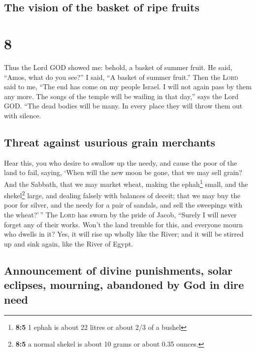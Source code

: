 \hypertarget{the-vision-of-the-basket-of-ripe-fruits}{%
\subsection{The vision of the basket of ripe
fruits}\label{the-vision-of-the-basket-of-ripe-fruits}}

\hypertarget{section-7}{%
\section{8}\label{section-7}}

 Thus the Lord GOD showed me: behold, a basket of summer
fruit.  He said, ``Amos, what do you see?'' I said, ``A
basket of summer fruit.'' Then the \textsc{Lord} said to me, ``The end
has come on my people Israel. I will not again pass by them any more.
 The songs of the temple will be wailing in that day,''
says the Lord GOD. ``The dead bodies will be many. In every place they
will throw them out with silence.

\hypertarget{threat-against-usurious-grain-merchants}{%
\subsection{Threat against usurious grain
merchants}\label{threat-against-usurious-grain-merchants}}

 Hear this, you who desire to swallow up the needy, and
cause the poor of the land to fail,  saying, `When will
the new moon be gone, that we may sell grain? And the Sabbath, that we
may market wheat, making the ephah\footnote{\textbf{8:5} 1 ephah is
  about 22 litres or about 2/3 of a bushel} small, and the
shekel\footnote{\textbf{8:5} a normal shekel is about 10 grams or about
  0.35 ounces.} large, and dealing falsely with balances of deceit;
 that we may buy the poor for silver, and the needy for a
pair of sandals, and sell the sweepings with the wheat?'\,''
 The \textsc{Lord} has sworn by the pride of Jacob,
``Surely I will never forget any of their works.  Won't
the land tremble for this, and everyone mourn who dwells in it? Yes, it
will rise up wholly like the River; and it will be stirred up and sink
again, like the River of Egypt.

\hypertarget{announcement-of-divine-punishments-solar-eclipses-mourning-abandoned-by-god-in-dire-need}{%
\subsection{Announcement of divine punishments, solar eclipses,
mourning, abandoned by God in dire
need}\label{announcement-of-divine-punishments-solar-eclipses-mourning-abandoned-by-god-in-dire-need}}

